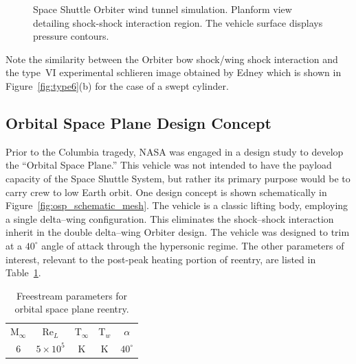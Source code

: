 \begin{figure}[hbtp]
\begin{center}
    \caption[Space Shuttle Orbiter wind tunnel simulation. Planform view detailing shock-shock interaction region.]{Space Shuttle Orbiter wind tunnel simulation. Planform view detailing shock-shock interaction region.  The vehicle surface displays pressure contours.\label{fig:orbiter_planform_interaction}}
  \end{center}
\end{figure}
Note the similarity between the Orbiter bow shock/wing shock interaction and the type~VI experimental schlieren image obtained by Edney which is shown in Figure~\ref{fig:type6}(b) for the case of a swept cylinder.


\clearpage
\subsection{Orbital Space Plane Design Concept}
Prior to the Columbia tragedy, NASA was engaged in a design study to develop the ``Orbital Space Plane.'' This vehicle was not intended to have the payload capacity of the Space Shuttle System, but rather its primary purpose would be to carry crew to low Earth orbit.  One design concept is shown schematically in Figure~\ref{fig:osp_schematic_mesh}.  The vehicle is a classic lifting body, employing a single delta--wing configuration.  This eliminates the shock--shock interaction inherit in the double delta--wing Orbiter design.  The vehicle was designed to trim at a $40^\circ$ angle of attack through the hypersonic regime.  The other parameters of interest, relevant to the post-peak heating portion of reentry, are listed in Table~\ref{table:osp-freestream-parameters}.

\begin{table}[hbtp]
  \begin{center}
    \caption{Freestream parameters for orbital space plane reentry.\label{table:osp-freestream-parameters}}
    \vspace{1em}
    \begin{tabular}{ccccc} \hline \hline
      M$_\infty$ & Re$_L$         & T$_\infty$ & T$_w$   & $\alpha$   \\
      6          & $5\times 10^5$ & \unit[200]{K}    & \unit[500]{K} & $40^\circ$ \\ \hline
    \end{tabular}
  \end{center}
\end{table}

